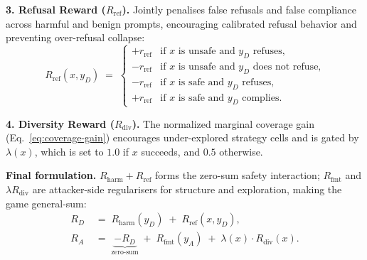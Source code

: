 \documentclass{article}
\begin{document}
\textbf{3. Refusal Reward ($R_{\mathrm{ref}}$).}
Jointly penalises false refusals and false compliance across harmful and benign prompts, encouraging calibrated refusal behavior and preventing over-refusal collapse:
\begin{equation}
  R_{\mathrm{ref}}(x, y_D) \;=\; \begin{cases}
    +r_{\mathrm{ref}} & \text{if $x$ is unsafe and $y_D$ refuses,}\\
    -r_{\mathrm{ref}} & \text{if $x$ is unsafe and $y_D$ does not refuse,}\\
    -r_{\mathrm{ref}} & \text{if $x$ is safe and $y_D$ refuses,}\\
    +r_{\mathrm{ref}} & \text{if $x$ is safe and $y_D$ complies.}
  \end{cases}
\end{equation}

\textbf{4. Diversity Reward ($R_{\mathrm{div}}$).}
The normalized marginal coverage gain (Eq.~\ref{eq:coverage-gain}) encourages under-explored strategy cells and is gated by $\lambda(x)$, which is set to $1.0$ if $x$ succeeds, and $0.5$ otherwise.


\textbf{Final formulation.}
$R_{\mathrm{harm}}+R_{\mathrm{ref}}$ forms the zero-sum safety interaction; $R_{\mathrm{fmt}}$ and $\lambda R_{\mathrm{div}}$ are attacker-side regularisers for structure and exploration, making the game general-sum:
\begin{align}
  R_D &\;=\; R_{\mathrm{harm}}(y_D) \;+\; R_{\mathrm{ref}}(x, y_D), \\
  R_A &\;=\; \underbrace{-R_D}_{\text{zero-sum}} \;+\; R_{\mathrm{fmt}}(y_A) \;+\; \lambda(x)\cdot R_{\mathrm{div}}(x). \label{eq:reward-A}
\end{align}


\end{document}
